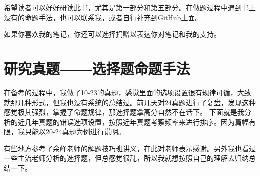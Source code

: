 \documentclass[lang=cn,newtx,10pt,scheme=chinese,pad,twocol]{zznote}
\begin{document}
{	希望读者可以好好研读此书，尤其是第一部分和第五部分。在做题过程中遇到书上没有的命题手法，也可以联系我，或者自行补充到GitHub上面。

	如果你喜欢我的笔记，你还可以选择捐赠以表达你对笔记和我的支持。
	\begin{figure}[htbp]
		\centering

		\caption*{}

	\end{figure}


}


\tableofcontents

\mainmatter

\chapter{研究真题——选择题命题手法}


在备考的过程中，我做了10-23的真题，感觉里面的选项设置很有规律可循，大致就那几种形式，但我也没有系统的总结过。前几天对24真题进行了复盘，发现这种感觉极其强烈，掌握了命题规律，那选择题拿高分自然不在话下。
下面就是我分析的近几年真题的错误选项设置，按照近年真题考察频率来进行排序。因为篇幅有限，我只能以20-24真题为例进行说明。

\vspace{0.5em}

\begin{remark}
	有些地方参考了余峰老师的解题技巧班讲义，在此对老师表示感谢。另外我也看过一些主流老师分析的选择题，但总感觉很乱，所以我就想按照自己的理解去归纳总结一下。
\end{remark}
\end{document}
